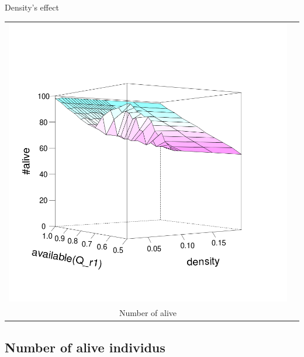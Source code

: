 \documentclass[8pt, handout=show,notes=show]{beamer}
\begin{document}
\begin{frame}{Density's effect}
\begin{table}[H]
\begin{tabular}{cc}
			\includegraphics[width=\imgSize]{images/active_median}\\
			Number of alive&\\
		\end{tabular}

	\end{table}

\end{frame}
\subsection{Number of alive individus}
\end{document}
